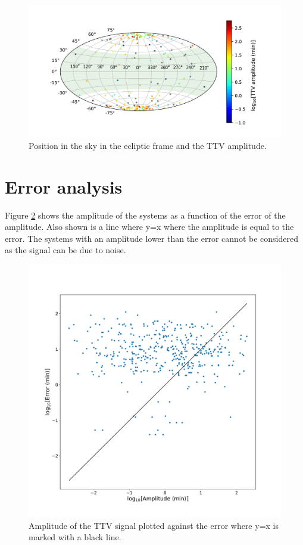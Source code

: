 \documentclass[12pt]{report}
\begin{document}
\begin{figure}[h!]
 	 \centering
	  \includegraphics[width=\textwidth]{img/skymap_TESS_amp_log_new.pdf}
	  \caption{Position in the sky in the ecliptic frame and the TTV amplitude.}
	 \label{fig:skymap_amp}
\end{figure}
\section{Error analysis}
		Figure \ref{fig:amp_error} shows the amplitude of the systems as a function of the error of the amplitude. Also shown is a line where y=x where the amplitude is equal to the error. The systems with an amplitude lower than the error cannot be considered as the signal can be due to noise.
\begin{figure}
 	 \centering
	  \includegraphics[width=\textwidth]{img/ampErrorLog.pdf}
	  \caption{Amplitude of the TTV signal plotted against the error where y=x is marked with a black line.}
	 \label{fig:amp_error}
\end{figure}
\end{document}

